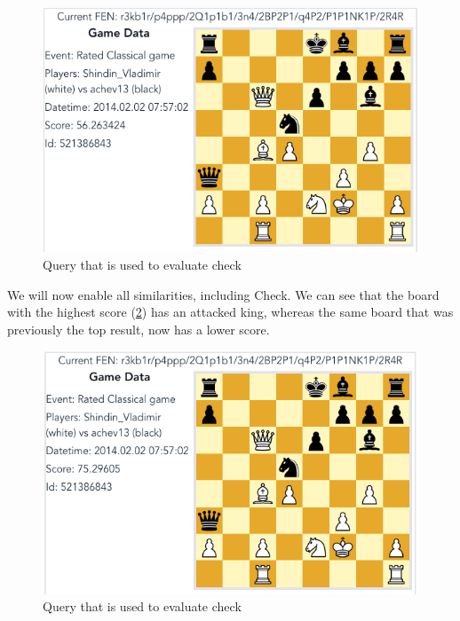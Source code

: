 \documentclass[11pt]{article}
\begin{document}
    \begin{figure}[H]
        \centering
        \includegraphics[width=12cm]{images/BlackCheck2-BoReAtDe}
        \caption{Query that is used to evaluate check}
        \label{fig:BlackCheck2-BoReAtDe}
    \end{figure}

    We will now enable all similarities, including Check. We can see that the board with the highest score (\ref{fig:BlackCheck1-BoReAtDeCh}) has an attacked king, whereas the same board that was previously the top result, now has a lower score.

    \begin{figure}[H]
        \centering
        \includegraphics[width=12cm]{images/BlackCheck1-BoReAtDeCh}
        \caption{Query that is used to evaluate check}
        \label{fig:BlackCheck1-BoReAtDeCh}
    \end{figure}
\end{document}
